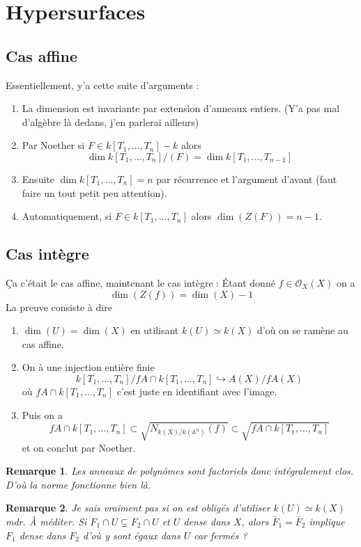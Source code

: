 \documentclass[a4paper,12pt]{book}
\newcommand{\A}{\mathbb{A}}
\newcommand{\Or}{\mathcal{O}}
\theoremstyle{plain}
\newtheorem{rem}{Remarque}
\theoremstyle{definition}
\theoremstyle{remark}
\begin{document}
\section{Hypersurfaces}
\subsection{Cas affine}
Essentiellement, y'a cette suite d'arguments :
\begin{enumerate}
    \item La dimension est invariante par extension d'anneaux entiers.
	(Y'a pas mal d'algèbre là dedans, j'en parlerai ailleurs)
    \item Par Noether si $F\in k[T_1,\ldots, T_n]-k$ alors 
	\[\dim k[T_1,\ldots, T_n]/(F)=\dim k[T_1,\ldots, T_{n-1}]\]
    \item Ensuite $\dim k[T_1,\ldots,T_n]=n$ par récurrence et 
	l'argument d'avant (faut faire un tout petit peu attention).
    \item Automatiquement, si $F\in k[T_1,\ldots, T_n]$ alors
	$\dim(Z(F))=n-1$.
\end{enumerate}
\subsection{Cas intègre}
Ça c'était le cas affine, maintenant le cas intègre : Étant donné
$f\in \Or_X(X)$ on a
\[\dim(Z(f))=\dim(X)-1\]
La preuve consiste à dire 
\begin{enumerate}
    \item $\dim(U)=\dim(X)$ en utilisant $k(U)\simeq k(X)$ d'où
	on se ramène au cas affine.
    \item On à une injection entière finie 
	\[k[T_1,\ldots, T_n]/fA\cap k[T_1,\ldots, T_n]\hookrightarrow
	A(X)/fA(X)\]
	où $fA\cap k[T_1,\ldots, T_n]$ c'est juste en identifiant avec
	l'image.
    \item Puis on a 
	\[fA\cap k[T_1,\ldots, T_n]\subset \sqrt{N_{k(X)/k(\A^n)}(f)}
	\subset \sqrt{fA\cap k[T_1,\ldots, T_n]}\]
    et on conclut par Noether.
\end{enumerate}
\begin{rem}
    Les anneaux de polynômes sont factoriels donc intégralement clos.
    D'où la norme fonctionne bien là.
\end{rem}
\begin{rem}
    Je sais vraiment pas si on est obligés d'utiliser $k(U)\simeq k(X)$
    mdr. À méditer. Si $F_1\cap U \subsetneq F_2\cap U$ et $U$ dense
    dans $X$, alors $\bar F_1 = \bar F_2$ implique $F_1$ dense dans 
    $F_2$ d'où y sont égaux dans $U$ car fermés ? 
\end{rem}
\end{document}
